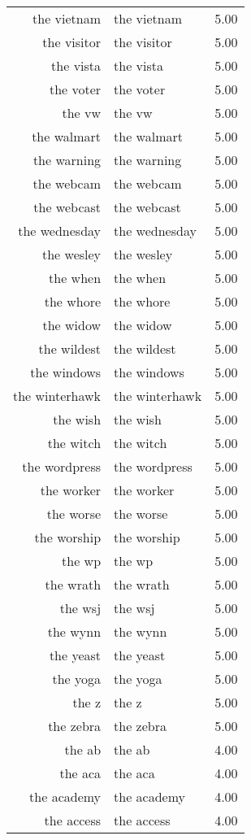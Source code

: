 \begin{table}[ht]
\begin{tabular}{rlr}
  the vietnam & the vietnam & 5.00 \\ 
  the visitor & the visitor & 5.00 \\ 
  the vista & the vista & 5.00 \\ 
  the voter & the voter & 5.00 \\ 
  the vw & the vw & 5.00 \\ 
  the walmart & the walmart & 5.00 \\ 
  the warning & the warning & 5.00 \\ 
  the webcam & the webcam & 5.00 \\ 
  the webcast & the webcast & 5.00 \\ 
  the wednesday & the wednesday & 5.00 \\ 
  the wesley & the wesley & 5.00 \\ 
  the when & the when & 5.00 \\ 
  the whore & the whore & 5.00 \\ 
  the widow & the widow & 5.00 \\ 
  the wildest & the wildest & 5.00 \\ 
  the windows & the windows & 5.00 \\ 
  the winterhawk & the winterhawk & 5.00 \\ 
  the wish & the wish & 5.00 \\ 
  the witch & the witch & 5.00 \\ 
  the wordpress & the wordpress & 5.00 \\ 
  the worker & the worker & 5.00 \\ 
  the worse & the worse & 5.00 \\ 
  the worship & the worship & 5.00 \\ 
  the wp & the wp & 5.00 \\ 
  the wrath & the wrath & 5.00 \\ 
  the wsj & the wsj & 5.00 \\ 
  the wynn & the wynn & 5.00 \\ 
  the yeast & the yeast & 5.00 \\ 
  the yoga & the yoga & 5.00 \\ 
  the z & the z & 5.00 \\ 
  the zebra & the zebra & 5.00 \\ 
  the ab & the ab & 4.00 \\ 
  the aca & the aca & 4.00 \\ 
  the academy & the academy & 4.00 \\ 
  the access & the access & 4.00 \\ 

\end{tabular}
\end{table}
